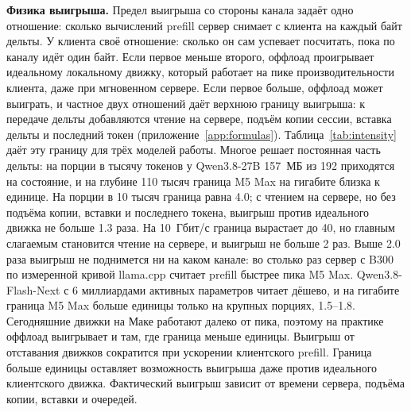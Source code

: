 \textbf{Физика выигрыша.} Предел выигрыша со стороны канала задаёт одно отношение: сколько вычислений prefill сервер
снимает с клиента на каждый байт дельты. У клиента своё отношение: сколько он сам успевает посчитать, пока по каналу
идёт один байт. Если первое меньше второго, оффлоад проигрывает идеальному локальному движку, который работает на
пике производительности клиента, даже при мгновенном сервере. Если первое больше, оффлоад может выиграть, и частное
двух отношений даёт верхнюю границу выигрыша: к передаче дельты добавляются чтение на сервере, подъём копии сессии,
вставка дельты и последний токен (приложение~\ref{app:formulas}). Таблица~\ref{tab:intensity} даёт эту границу для
трёх моделей работы. Многое решает постоянная часть дельты: на порции в тысячу токенов у Qwen3.8-27B 157~МБ из 192
приходятся на состояние, и на глубине 110 тысяч граница M5 Max на гигабите близка к единице. На порции в 10 тысяч
граница равна 4.0; с чтением на сервере, но без подъёма копии, вставки и последнего токена, выигрыш против
идеального движка не больше 1.3 раза. На 10~Гбит/с граница вырастает до 40, но главным слагаемым становится чтение на
сервере, и выигрыш не больше 2 раз. Выше 2.0 раза выигрыш не поднимется ни на каком канале: во столько раз сервер с B300 по измеренной кривой llama.cpp
считает prefill быстрее пика M5 Max. Qwen3.8-Flash-Next с 6 миллиардами активных параметров читает дёшево, и на
гигабите граница M5 Max больше единицы только на крупных порциях, 1.5--1.8. Сегодняшние движки на Маке работают
далеко от пика, поэтому на практике оффлоад выигрывает и там, где граница меньше единицы. Выигрыш от отставания движков сократится при ускорении клиентского prefill. Граница больше единицы оставляет возможность выигрыша даже
против идеального клиентского движка. Фактический выигрыш зависит от времени сервера, подъёма копии,
вставки и очередей.


